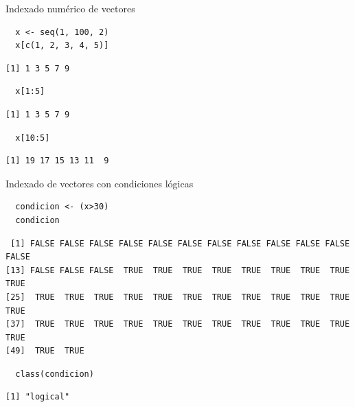 \documentclass[xcolor={usenames,svgnames,dvipsnames}]{beamer}
\begin{document}
\begin{frame}[fragile,label=sec-2-1-6]{Indexado numérico de vectores}
 \lstset{language=R,label= ,caption= ,numbers=none}
\begin{lstlisting}
  x <- seq(1, 100, 2)
  x[c(1, 2, 3, 4, 5)]
\end{lstlisting}

\begin{verbatim}
[1] 1 3 5 7 9
\end{verbatim}

\lstset{language=R,label= ,caption= ,numbers=none}
\begin{lstlisting}
  x[1:5]
\end{lstlisting}

\begin{verbatim}
[1] 1 3 5 7 9
\end{verbatim}

\lstset{language=R,label= ,caption= ,numbers=none}
\begin{lstlisting}
  x[10:5]
\end{lstlisting}

\begin{verbatim}
[1] 19 17 15 13 11  9
\end{verbatim}
\end{frame}

\begin{frame}[fragile,label=sec-2-1-7]{Indexado de vectores con condiciones lógicas}
 \lstset{language=R,label= ,caption= ,numbers=none}
\begin{lstlisting}
  condicion <- (x>30)
  condicion
\end{lstlisting}

\begin{verbatim}
 [1] FALSE FALSE FALSE FALSE FALSE FALSE FALSE FALSE FALSE FALSE FALSE FALSE
[13] FALSE FALSE FALSE  TRUE  TRUE  TRUE  TRUE  TRUE  TRUE  TRUE  TRUE  TRUE
[25]  TRUE  TRUE  TRUE  TRUE  TRUE  TRUE  TRUE  TRUE  TRUE  TRUE  TRUE  TRUE
[37]  TRUE  TRUE  TRUE  TRUE  TRUE  TRUE  TRUE  TRUE  TRUE  TRUE  TRUE  TRUE
[49]  TRUE  TRUE
\end{verbatim}

\lstset{language=R,label= ,caption= ,numbers=none}
\begin{lstlisting}
  class(condicion)
\end{lstlisting}

\begin{verbatim}
[1] "logical"
\end{verbatim}
\end{frame}
\end{document}
